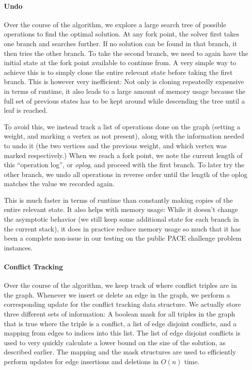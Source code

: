 \documentclass[12pt,oneside,english,parskip=full,headings=small]{scrbook}
\theoremstyle{definition}
\begin{document}
\paragraph{Undo} Over the course of the algorithm, we explore a large search tree of possible
operations to find the optimal solution. At any fork point, the solver first takes one branch and
searches further. If no solution can be found in that branch, it then tries the other branch. To
take the second branch, we need to again have the initial state at the fork point available to
continue from. A very simple way to achieve this is to simply clone the entire relevant state before
taking the first branch. This is however very inefficient: Not only is cloning repeatedly expensive
in terms of runtime, it also leads to a large amount of memory usage because the full set of
previous states has to be kept around while descending the tree until a leaf is reached.

To avoid this, we instead track a list of operations done on the graph (setting a weight, and
marking a vertex as not present), along with the information needed to undo it (the two vertices and
the previous weight, and which vertex was marked respectively.) When we reach a fork point, we note
the current length of this ``operation log'', or \emph{oplog}, and proceed with the first branch. To
later try the other branch, we undo all operations in reverse order until the length of the oplog
matches the value we recorded again.

This is much faster in terms of runtime than constantly making copies of the entire relevant state.
It also helps with memory usage: While it doesn't change the asymptotic behavior (we still keep
some additional state for each branch in the current stack), it does in practice reduce memory usage
so much that it has been a complete non-issue in our testing on the public PACE challenge problem
instances.

\paragraph{Conflict Tracking} Over the course of the algorithm, we keep track of where conflict
triples are in the graph. Whenever we insert or delete an edge in the graph, we perform a
corresponding update for the conflict tracking data structure. We actually store three different
sets of information: A boolean mask for all triples in the graph that is true where the triple is a
conflict, a list of edge disjoint conflicts, and a mapping from edges to indices into this list.
The list of edge disjoint conflicts is used to very quickly calculate a lower bound on the size of
the solution, as described earlier. The mapping and the mask structures are used to efficiently
perform updates for edge insertions and deletions in $O(n)$ time.
\end{document}

